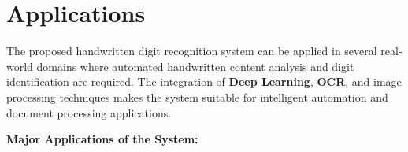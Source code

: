 \documentclass[12pt,a4paper]{article}
\begin{document}
\newpage

\section{Applications}

\vspace{0.3cm}

\noindent
The proposed handwritten digit recognition system can be applied in several real-world domains where automated handwritten content analysis and digit identification are required. The integration of \textbf{Deep Learning}, \textbf{OCR}, and image processing techniques makes the system suitable for intelligent automation and document processing applications.

\vspace{0.4cm}

\noindent
\textbf{Major Applications of the System:}
\end{document}
